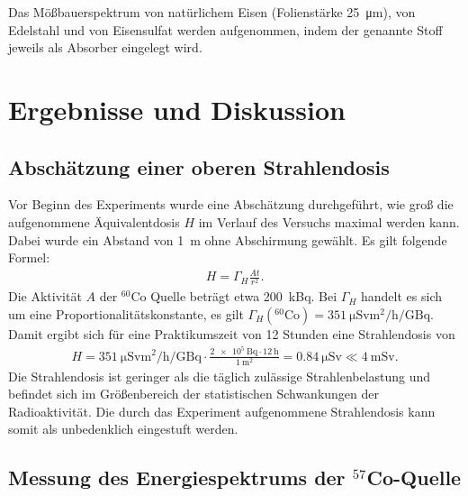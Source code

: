 \documentclass[a4paper,twoside,final]{article}
\begin{document}
Das Mößbauerspektrum von natürlichem Eisen (Folienstärke \SI{25}{\micro\meter}), von Edelstahl und von Eisensulfat werden aufgenommen, indem der genannte Stoff jeweils als Absorber eingelegt wird.



\newpage
\section{Ergebnisse und Diskussion}
\subsection{Abschätzung einer oberen Strahlendosis}
Vor Beginn des Experiments wurde eine Abschätzung durchgeführt, wie groß die aufgenommene Äquivalentdosis $H$ im Verlauf des Versuchs maximal werden kann. Dabei wurde ein Abstand von \SI{1}{\metre} ohne Abschirmung gewählt. Es gilt folgende Formel:
\begin{align}
  H = \Gamma_H \frac{A t}{r^2}.
\end{align}
Die Aktivität $A$ der $^{60}$Co Quelle beträgt etwa \SI{200}{\kilo\becquerel}. Bei $\Gamma_H$ handelt es sich um eine Proportionalitätskonstante, es gilt $\Gamma_H(^{60}\text{Co})= \SI{351}{\micro\sievert\metre\squared\per\hour\per\giga\becquerel}$. Damit ergibt sich für eine Praktikumszeit von 12 Stunden eine Strahlendosis von
\begin{align}
  H = \SI[per-mode=fraction]{351}{\micro\sievert\metre\squared\per\hour\per\giga\becquerel} \cdot\frac{\SI{2e5}{\becquerel}\cdot\SI{12}{\hour}}{\SI{1}{\metre\squared}}= \SI{0,84}{\micro\sievert} \ll \SI{4}{\milli\sievert}.
\end{align}
Die Strahlendosis ist geringer als die täglich zulässige Strahlenbelastung und befindet sich im Größenbereich der statistischen Schwankungen der Radioaktivität. Die durch das Experiment aufgenommene Strahlendosis kann somit als unbedenklich eingestuft werden.

\subsection{Messung des Energiespektrums der $^{57}$Co-Quelle}
\end{document}
